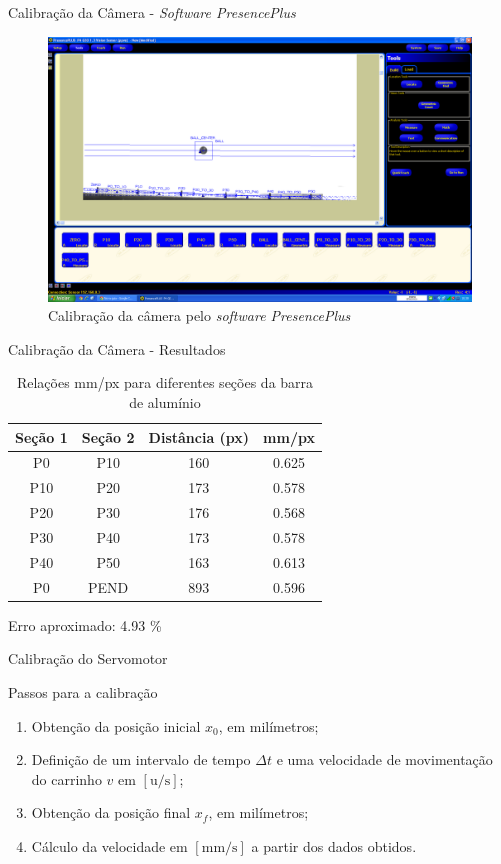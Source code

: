 \documentclass[10pt]{beamer}
\begin{document}
\begin{frame}[fragile]{Calibração da Câmera - \textit{Software PresencePlus}}
\begin{figure}[!ht]
\centering
\includegraphics[width=.9\linewidth]{figures/resultados/camera/programa}
\caption{Calibração da câmera pelo \textit{software PresencePlus} \label{calibcamera}}
\end{figure}
\end{frame}

\begin{frame}[fragile]{Calibração da Câmera - Resultados}
\begin{table}[!ht]
\centering
\caption{Relações mm/px para diferentes seções da barra de alumínio \label{relacoesmmpx}}
	\begin{tabular}{|c|c|c|c|}
	\hline
		Seção 1 & Seção 2 & Distância (px) & mm/px\\ \hline
		P0 & P10 & 160 & 0.625\\ \hline
		P10 & P20 & 173 & 0.578\\ \hline
		P20 & P30 & 176 & 0.568\\ \hline
		P30 & P40 & 173 & 0.578\\ \hline
		P40 & P50 & 163 & 0.613\\ \hline
		P0 & PEND & 893 & 0.596\\ \hline
	\end{tabular}
\end{table}
Erro aproximado: 4.93 \%
\end{frame}
                                         
\begin{frame}[fragile]{Calibração do Servomotor}
\begin{block}{Passos para a calibração}                       
\begin{enumerate}
	\item Obtenção da posição inicial $x_0$, em milímetros;
	\item Definição de um intervalo de tempo $\Delta t$ e uma velocidade de movimentação do carrinho $v$ em $[\mathrm{u}/\mathrm{s}]$;
	\item Obtenção da posição final $x_f$, em milímetros;
	\item Cálculo da velocidade em $[\mathrm{mm}/\mathrm{s}]$ a partir dos dados obtidos.
\end{enumerate}
\end{block}
\end{frame}
\end{document}
